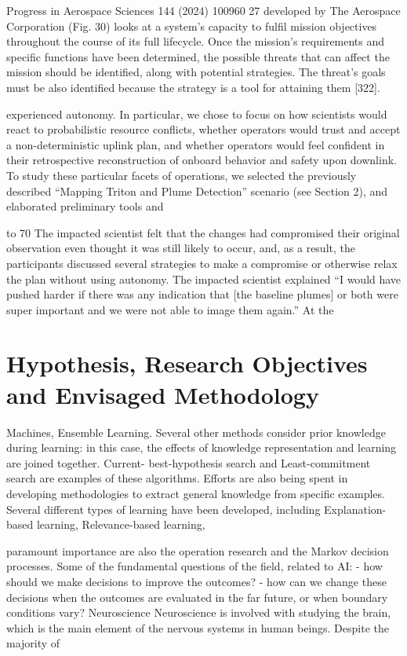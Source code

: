 \documentclass[a4paper,12pt]{article}
\begin{document}
Progress in Aerospace Sciences 144 (2024) 100960
27
developed by The Aerospace Corporation (Fig. 30) looks at a system’s 
capacity to fulfil mission objectives throughout the course of its full 
lifecycle. Once the mission’s requirements and specific functions have 
been determined, the possible threats that can affect the mission should 
be identified, along with potential strategies. The threat’s goals must be 
also identified because the strategy is a tool for attaining them [322].

experienced autonomy. In particular, we chose to focus on
how scientists would react to probabilistic resource conﬂicts,
whether operators would trust and accept a non-deterministic
uplink plan, and whether operators would feel conﬁdent in
their retrospective reconstruction of onboard behavior and
safety upon downlink.
To study these particular facets of operations, we selected the
previously described “Mapping Triton and Plume Detection”
scenario (see Section 2), and elaborated preliminary tools and

to 70%
The impacted scientist felt that the changes had
compromised their original observation even thought it was
still likely to occur, and, as a result, the participants discussed
several strategies to make a compromise or otherwise relax
the plan without using autonomy.
The impacted scientist
explained “I would have pushed harder if there was any
indication that [the baseline plumes] or both were super
important and we were not able to image them again.” At the

\section{Hypothesis, Research Objectives and Envisaged Methodology}

Machines, Ensemble Learning. 
Several other methods consider prior knowledge during learning: in this case, 
the effects of knowledge representation and learning are joined together. Current-
best-hypothesis search and Least-commitment search are examples of these 
algorithms. Efforts are also being spent in developing methodologies to extract 
general knowledge from specific examples. Several different types of learning have 
been developed, including Explanation-based learning, Relevance-based learning,

paramount importance are also the 
operation research and the Markov 
decision 
processes. 
Some of the fundamental questions of 
the 
field, 
related 
to 
AI: 
- how should we make decisions to 
improve 
the 
outcomes? 
- how can we change these decisions 
when the outcomes are evaluated in the 
far future, or when boundary conditions 
vary? 
Neuroscience 
Neuroscience is involved with 
studying the brain, which is the main 
element of the nervous systems in 
human beings. Despite the majority of
\end{document}
